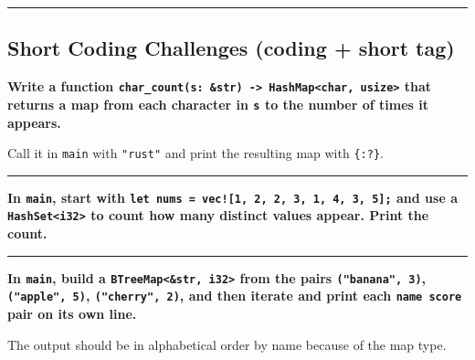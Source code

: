 \documentclass[
  11pt,
]{article}
\newenvironment{Shaded}{}{}
\begin{document}
\begin{center}\rule{0.5\linewidth}{0.5pt}\end{center}

\subsection{Short Coding Challenges (coding + short
tag)}\label{short-coding-challenges-coding-short-tag}

\textbf{Write a function
\texttt{char\_count(s:\ \&str)\ -\textgreater{}\ HashMap\textless{}char,\ usize\textgreater{}}
that returns a map from each character in \texttt{s} to the number of
times it appears.}

Call it in \texttt{main} with \texttt{"rust"} and print the resulting
map with \texttt{\{:?\}}.

\begin{Shaded}
\begin{Highlighting}[]


\end{Highlighting}
\end{Shaded}

\begin{center}\rule{0.5\linewidth}{0.5pt}\end{center}

\textbf{In \texttt{main}, start with
\texttt{let\ nums\ =\ vec!{[}1,\ 2,\ 2,\ 3,\ 1,\ 4,\ 3,\ 5{]};} and use
a \texttt{HashSet\textless{}i32\textgreater{}} to count how many
distinct values appear. Print the count.}

\begin{Shaded}
\begin{Highlighting}[]


\end{Highlighting}
\end{Shaded}

\begin{center}\rule{0.5\linewidth}{0.5pt}\end{center}

\textbf{In \texttt{main}, build a
\texttt{BTreeMap\textless{}\&str,\ i32\textgreater{}} from the pairs
\texttt{("banana",\ 3)}, \texttt{("apple",\ 5)},
\texttt{("cherry",\ 2)}, and then iterate and print each
\texttt{name\ score} pair on its own line.}

The output should be in alphabetical order by name because of the map
type.

\begin{Shaded}
\begin{Highlighting}[]


\end{Highlighting}
\end{Shaded}
\end{document}
